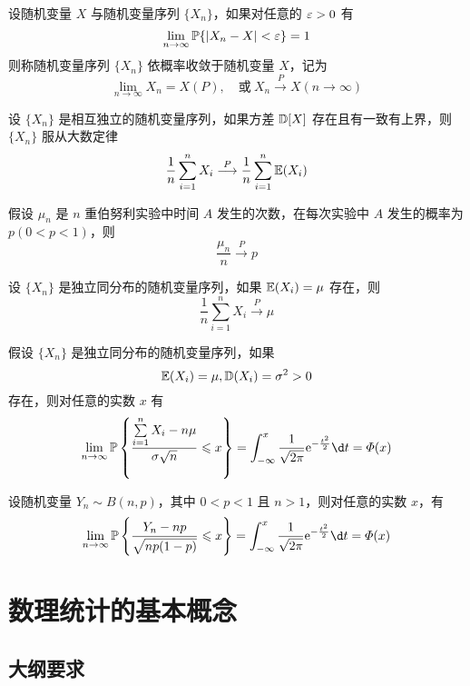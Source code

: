 设随机变量 $X$ 与随机变量序列 $\{X_n\}$，如果对任意的 $\varepsilon > 0$ 有
\[ \lim_{n \to \infty} \mathbb{P}\{|X_n - X| < \varepsilon \} =1 \]
则称随机变量序列 $\{X_n\}$ 依概率收敛于随机变量 $X$，记为
\[ \lim_{n \to \infty} X_n = X(P), \quad \text{或}\ X_n \stackrel{P}{\longrightarrow} X(n \to \infty) \]

\begin{theorem}[切比雪夫大数定律]
	设 $\{X_n\}$ 是相互独立的随机变量序列，如果方差 $\mathbb{D} [X]$ 存在且有一致有上界，则 $\{X_n\}$ 服从大数定律
	\[ \frac{1}{n} \sum_{i=1}^n X_i \stackrel{P}{\longrightarrow} \frac{1}{n} \sum_{i=1}^n \mathbb{E}(X_i) \]
\end{theorem}

\begin{theorem}[伯努利大数定律]
	假设 $\mu_n$ 是 $n$ 重伯努利实验中时间 $A$ 发生的次数，在每次实验中 $A$ 发生的概率为 $p(0 < p < 1)$，则
	\[ \frac{\mu_n}{n} \stackrel{P}{\longrightarrow} p \]
\end{theorem}

\begin{theorem}[辛钦大数定律]
	设 $\{X_n\}$ 是独立同分布的随机变量序列，如果 $\mathbb{E}(X_i) = \mu$ 存在，则
	\[ \frac{1}{n} \sum_{i=1}^n X_i \stackrel{P}{\longrightarrow} \mu \]
\end{theorem}

\begin{theorem}[列维 - 林德伯格定理]
	假设 $\{X_n\}$ 是独立同分布的随机变量序列，如果
	\[ \mathbb{E}(X_i) = \mu, \mathbb{D}(X_i) = \sigma^2 > 0 \]
	存在，则对任意的实数 $x$ 有
	\[ \lim_{n \to \infty} \bbP\left\{ \frac{\sum\limits_{i=1}^n X_i - n \mu}{\sigma \sqrt{n}} \leqslant x \right\} =  \int_{-\infty}^x \frac{1}{\sqrt{2 \pi}} \ee^{-\frac{t^2}{2}} \d t = \varPhi(x)  \]
\end{theorem}

\begin{theorem}
	设随机变量 $Y_n \sim B(n, p)$，其中 $0 < p < 1$ 且 $n > 1$，则对任意的实数 $x$，有
	\[ \lim_{n \to \infty} \bbP\left\{ \frac{Y_n - np}{\sqrt{np(1 - p)}} \leqslant x \right\} =  \int_{-\infty}^x \frac{1}{\sqrt{2 \pi}} \ee^{-\frac{t^2}{2}} \d t = \varPhi(x)  \]
\end{theorem}


\section{数理统计的基本概念}

\subsection{大纲要求}

